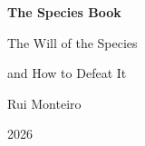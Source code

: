\begin{titlepage}
    \centering
    \vspace*{2cm}
    
    {\Huge\bfseries The Species Book\par}
    \vspace{1.5cm}
    
    {\LARGE The Will of the Species\par}
    {\Large and How to Defeat It\par}
    \vspace{2cm}
    
    {\Large Rui Monteiro\par}
    \vfill
    
    {\large 2026\par}
\end{titlepage}